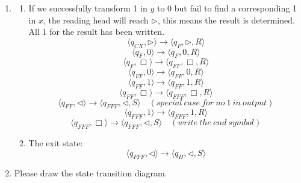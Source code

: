 \documentclass[12pt,a4paper]{article}
\makeatletter
\newtheorem*{solution}{Solution}
\theoremstyle{definition}
\renewenvironment{solution}[1][Solution] {\par\pushQED{\qed}\normalfont\topsep6\p@\@plus6\p@\relax\trivlist\item[\hskip\labelsep\bfseries#1\@addpunct{.}]\ignorespaces}{\popQED\endtrivlist\@endpefalse} \makeatother
\makeatother
\begin{document}
\begin{enumerate}
\begin{enumerate}
\begin{solution}
\begin{enumerate}
\begin{enumerate}
	       
	          \item If we successfully transform 1 in $y$ to 0 but fail to find a corresponding 1 in $x$, the reading head will reach $\triangleright$, this means the result is determined. All 1 for the result has been written.
	           $$
	       \langle q_{CX},\triangleright \rangle \rightarrow \langle q_{F}, \triangleright, R\rangle
	       $$
	       $$
	       \langle q_{F},0 \rangle \rightarrow \langle q_{F}, 0, R\rangle
	       $$
	       $$
	       \langle q_{F},\Box \rangle \rightarrow \langle q_{FF}, \Box, R\rangle
	       $$
	        $$
	       \langle q_{FF},0 \rangle \rightarrow \langle q_{FF}, 0, R\rangle
	       $$
	       $$
	       \langle q_{FF},1 \rangle \rightarrow \langle q_{FF}, 1, R\rangle
	       $$
	       $$
	       \langle q_{FF},\Box \rangle \rightarrow \langle q_{FFF}, \Box, R\rangle
	       $$
	       $$
	       \langle q_{FF},\triangleleft \rangle \rightarrow \langle q_{FFF}, \triangleleft, S\rangle\quad(special\ case\ for\ no\ 1\ in\ output)
	       $$
	       $$
	       \langle q_{FFF},1 \rangle \rightarrow \langle q_{FFF}, 1, R\rangle
	       $$
	       $$
	       \langle q_{FFF},\Box \rangle \rightarrow \langle q_{FFF}, \triangleleft , S\rangle
	       \quad (write\ the\ end\ symbol)$$
	       
	     \item The exit state:
	     $$
	        \langle q_{FFF},\triangleleft \rangle \rightarrow \langle q_{H}, \triangleleft , S\rangle 
	       $$
	       
	    \end{enumerate}
	    
	    
	\end{enumerate}
	\end{solution}
	\item
	Please draw the state transition diagram.
	
\end{enumerate}
\end{enumerate}
\end{document}
